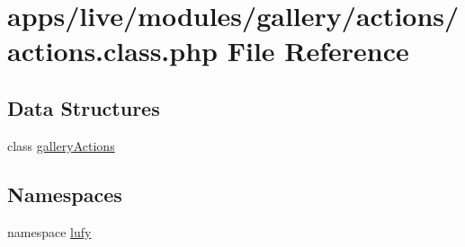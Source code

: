 \hypertarget{live_2modules_2gallery_2actions_2actions_8class_8php}{\section{apps/live/modules/gallery/actions/actions.class.\-php File Reference}
\label{live_2modules_2gallery_2actions_2actions_8class_8php}
}
\subsection*{Data Structures}
\begin{DoxyCompactItemize}
\item 
class \hyperlink{classgallery_actions}{gallery\-Actions}
\end{DoxyCompactItemize}
\subsection*{Namespaces}
\begin{DoxyCompactItemize}
\item 
namespace \hyperlink{namespacelufy}{lufy}
\end{DoxyCompactItemize}
